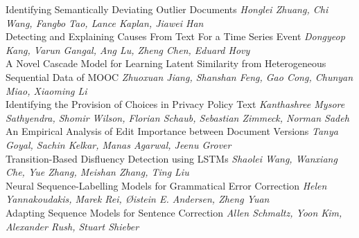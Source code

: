 \documentclass{book}
\begin{document}
    \noindent	Identifying Semantically Deviating Outlier Documents \newline 
    {\itshape Honglei Zhuang, Chi Wang, Fangbo Tao, Lance Kaplan, Jiawei Han} \\
    
    \noindent	Detecting and Explaining Causes From Text For a Time Series Event \newline 
    {\itshape Dongyeop Kang, Varun Gangal, Ang Lu, Zheng Chen, Eduard Hovy} \\
    
    \noindent	A Novel Cascade Model for Learning Latent Similarity from Heterogeneous Sequential Data of MOOC \newline 
    {\itshape Zhuoxuan Jiang, Shanshan Feng, Gao Cong, Chunyan Miao, Xiaoming Li} \\
    
    \noindent	Identifying the Provision of Choices in Privacy Policy Text \newline 
    {\itshape Kanthashree Mysore Sathyendra, Shomir Wilson, Florian Schaub, Sebastian Zimmeck, Norman Sadeh} \\
    
    \noindent	An Empirical Analysis of Edit Importance between Document Versions \newline 
    {\itshape Tanya Goyal, Sachin Kelkar, Manas Agarwal, Jeenu Grover} \\
    
    \noindent	Transition-Based Disfluency Detection using LSTMs \newline 
    {\itshape Shaolei Wang, Wanxiang Che, Yue Zhang, Meishan Zhang, Ting Liu} \\
    
    \noindent	Neural Sequence-Labelling Models for Grammatical Error Correction \newline 
    {\itshape Helen Yannakoudakis, Marek Rei, Øistein E. Andersen, Zheng Yuan} \\
    
    \noindent	Adapting Sequence Models for Sentence Correction \newline 
    {\itshape Allen Schmaltz, Yoon Kim, Alexander Rush, Stuart Shieber} \\
    
\end{document}
